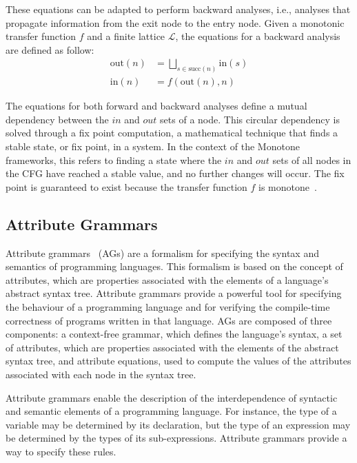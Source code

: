 These equations can be adapted to perform backward analyses, i.e., analyses that
propagate information from the exit node to the entry node.
Given a monotonic transfer function $f$ and a finite lattice $\mathcal{L}$, the equations for
a backward analysis are defined as follow:
\begin{align*}
  \text{out}(n) &= \bigsqcup\limits_{s \in \text{succ}(n)} \text{in}(s) \\
  \text{in}(n) &= f(\text{out}(n),n)
\end{align*}

The equations for both forward and backward analyses define a mutual dependency
between the $in$ and $out$ sets of a node.
This circular dependency is solved through a fix point computation,
a mathematical technique that finds a stable state, or fix point, in a system.
In the context of the Monotone frameworks, this
refers to finding a state where the $in$ and $out$ sets of all nodes in the CFG have reached a
stable value, and no further changes will occur. The fix point is guaranteed to exist
because the transfer function $f$ is monotone~\cite{Knaster1929}.



\subsection{Attribute Grammars}%
\label{chap:attr-grammars}
Attribute grammars~\cite{knuth1968semantics} (AGs) are a formalism for specifying
the syntax and semantics of programming languages. This formalism is based on the concept of attributes,
which are properties associated with the elements of a language's abstract syntax tree.
Attribute grammars provide a powerful tool for specifying the behaviour of a programming
language and for verifying the compile-time correctness of programs written in that language.
%
AGs are composed of three components: a context-free grammar,
which defines the language's syntax,  a set of attributes,
which are properties associated with the elements of the abstract syntax tree,
and attribute equations, used to compute the values of the attributes associated with each node in the syntax tree.

Attribute grammars enable the description of the
interdependence of syntactic and semantic elements of a programming language.
For instance, the type of a variable may be determined by its declaration,
but the type of an expression may be determined by the types of its sub-expressions.
Attribute grammars provide a way to specify these rules.

